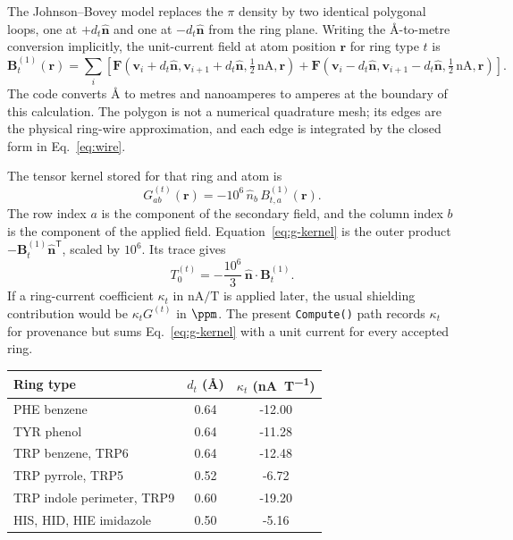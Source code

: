 \documentclass[11pt]{article}
\begin{document}
The Johnson--Bovey model replaces the \(\pi\) density by two identical polygonal
loops, one at \(+d_t\hat{\bm n}\) and one at \(-d_t\hat{\bm n}\) from the ring
plane. Writing the \(\si{\angstrom}\)-to-metre conversion implicitly, the
unit-current field at atom position \(\bm r\) for ring type \(t\) is
\begin{equation}
  \bm B^{(1)}_t(\bm r)=
  \sum_i \left[
  \bm F(\bm v_i+d_t\hat{\bm n},\bm v_{i+1}+d_t\hat{\bm n},
         \tfrac{1}{2}\,\si{\nano\ampere},\bm r)
  +\bm F(\bm v_i-d_t\hat{\bm n},\bm v_{i+1}-d_t\hat{\bm n},
         \tfrac{1}{2}\,\si{\nano\ampere},\bm r)
  \right].
  \label{eq:double-loop}
\end{equation}
The code converts \(\si{\angstrom}\) to metres and nanoamperes to amperes at
the boundary of this calculation. The polygon is not a numerical quadrature
mesh; its edges are the physical ring-wire approximation, and each edge is
integrated by the closed form in Eq.~\eqref{eq:wire}.

The tensor kernel stored for that ring and atom is
\begin{equation}
  G^{(t)}_{ab}(\bm r)=-10^6\,\hat n_b\,B^{(1)}_{t,a}(\bm r).
  \label{eq:g-kernel}
\end{equation}
The row index \(a\) is the component of the secondary field, and the column
index \(b\) is the component of the applied field. Equation~\eqref{eq:g-kernel}
is the outer product \(-\bm B^{(1)}_t\hat{\bm n}^{\mathsf T}\), scaled by
\(10^6\). Its trace gives
\begin{equation}
  T_0^{(t)}=-\frac{10^6}{3}\,\hat{\bm n}\cdot\bm B^{(1)}_t .
  \label{eq:bs-t0}
\end{equation}
If a ring-current coefficient \(\kappa_t\) in
\(\si{\nano\ampere\per\tesla}\) is applied later, the usual shielding
contribution would be \(\kappa_t G^{(t)}\) in \(\si{\ppm}\). The present
\texttt{Compute()} path records \(\kappa_t\) for provenance but sums
Eq.~\eqref{eq:g-kernel} with a unit current for every accepted ring.

\begin{center}
\small
\begin{tabular}{lcc}
\hline
Ring type & \(d_t\) (\si{\angstrom}) & \(\kappa_t\) (\si{\nano\ampere\per\tesla})\\
\hline
PHE benzene & 0.64 & -12.00\\
TYR phenol & 0.64 & -11.28\\
TRP benzene, TRP6 & 0.64 & -12.48\\
TRP pyrrole, TRP5 & 0.52 & -6.72\\
TRP indole perimeter, TRP9 & 0.60 & -19.20\\
HIS, HID, HIE imidazole & 0.50 & -5.16\\
\hline
\end{tabular}
\end{center}
\end{document}
